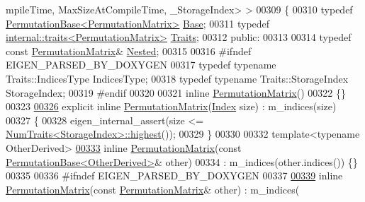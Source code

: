\begin{DoxyCode}
      mpileTime, MaxSizeAtCompileTime, \_StorageIndex> >
00309 \{
00310     \textcolor{keyword}{typedef} \hyperlink{group___core___module_class_eigen_1_1_permutation_base}{PermutationBase<PermutationMatrix>} 
      \hyperlink{group___core___module_class_eigen_1_1_permutation_base}{Base};
00311     \textcolor{keyword}{typedef} \hyperlink{struct_eigen_1_1internal_1_1traits}{internal::traits<PermutationMatrix>} 
      \hyperlink{struct_eigen_1_1internal_1_1traits}{Traits};
00312   \textcolor{keyword}{public}:
00313 
00314     \textcolor{keyword}{typedef} \textcolor{keyword}{const} \hyperlink{group___core___module_class_eigen_1_1_permutation_matrix}{PermutationMatrix}& \hyperlink{group___core___module_class_eigen_1_1_permutation_matrix}{Nested};
00315 
00316 \textcolor{preprocessor}{    #ifndef EIGEN\_PARSED\_BY\_DOXYGEN}
00317     \textcolor{keyword}{typedef} \textcolor{keyword}{typename} Traits::IndicesType IndicesType;
00318     \textcolor{keyword}{typedef} \textcolor{keyword}{typename} Traits::StorageIndex StorageIndex;
00319 \textcolor{preprocessor}{    #endif}
00320 
00321     \textcolor{keyword}{inline} \hyperlink{group___core___module_class_eigen_1_1_permutation_matrix}{PermutationMatrix}()
00322     \{\}
00323 
\hyperlink{group___core___module_aea29eab1fd6a6562971db7b9c04c11aa}{00326}     \textcolor{keyword}{explicit} \textcolor{keyword}{inline} \hyperlink{group___core___module_aea29eab1fd6a6562971db7b9c04c11aa}{PermutationMatrix}(\hyperlink{group___core___module_a554f30542cc2316add4b1ea0a492ff02}{Index} size) : m\_indices(size)
00327     \{
00328       eigen\_internal\_assert(size <= \hyperlink{group___core___module_struct_eigen_1_1_num_traits}{NumTraits<StorageIndex>::highest}());
00329     \}
00330 
00332     \textcolor{keyword}{template}<\textcolor{keyword}{typename} OtherDerived>
\hyperlink{group___core___module_a7ae7016a606b08573013115dcf2e56f2}{00333}     \textcolor{keyword}{inline} \hyperlink{group___core___module_a7ae7016a606b08573013115dcf2e56f2}{PermutationMatrix}(\textcolor{keyword}{const} 
      \hyperlink{group___core___module_class_eigen_1_1_permutation_base}{PermutationBase<OtherDerived>}& other)
00334       : m\_indices(other.indices()) \{\}
00335 
00336 \textcolor{preprocessor}{    #ifndef EIGEN\_PARSED\_BY\_DOXYGEN}
00337 
\hyperlink{group___core___module_a75a003685dfbf43b2809df33012f1edd}{00339}     \textcolor{keyword}{inline} \hyperlink{group___core___module_a75a003685dfbf43b2809df33012f1edd}{PermutationMatrix}(\textcolor{keyword}{const} \hyperlink{group___core___module_class_eigen_1_1_permutation_matrix}{PermutationMatrix}& other) : m\_indices(

\end{DoxyCode}
